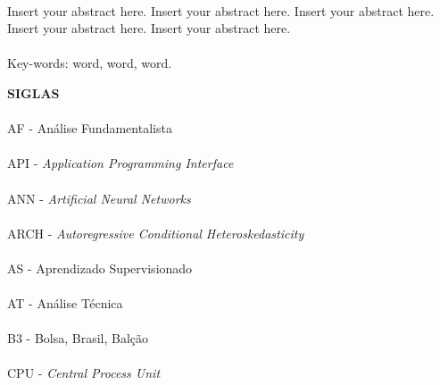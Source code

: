 \paragraph{}Insert your abstract here. Insert your abstract here. Insert your abstract here. Insert your abstract here. Insert your abstract here.
\paragraph{}
\noindent Key-words: word, word, word.

\pagebreak


\begin{center}
\textbf{SIGLAS}
\end{center}
      \vspace{0.5cm}

\paragraph{}AF - Análise Fundamentalista
\paragraph{}API - \textit{Application Programming Interface}
\paragraph{}ANN - \textit{Artificial Neural Networks}
\paragraph{}ARCH - \textit{Autoregressive Conditional Heteroskedasticity}
\paragraph{}AS - Aprendizado Supervisionado
\paragraph{}AT - Análise Técnica
\paragraph{}B3 - Bolsa, Brasil, Balção
\paragraph{}CPU - \textit{Central Process Unit}
